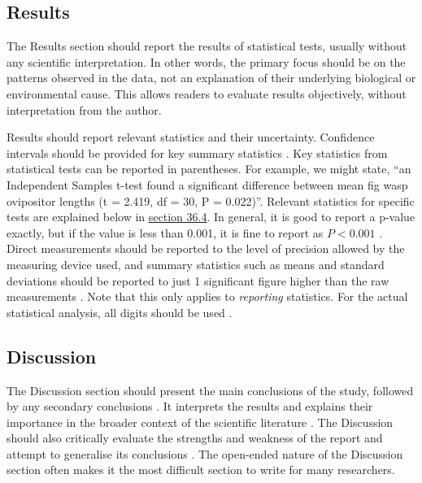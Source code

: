 \documentclass[
]{scrbook}
\begin{document}
\hypertarget{results}{%
\subsection{Results}\label{results}}

The Results section should report the results of statistical tests, usually without any scientific interpretation.
In other words, the primary focus should be on the patterns observed in the data, not an explanation of their underlying biological or environmental cause.
This allows readers to evaluate results objectively, without interpretation from the author.

Results should report relevant statistics and their uncertainty.
Confidence intervals should be provided for key summary statistics \citep{Lang1997}.
Key statistics from statistical tests can be reported in parentheses.
For example, we might state, ``an Independent Samples t-test found a significant difference between mean fig wasp ovipositor lengths (t = 2.419, df = 30, P = 0.022)''.
Relevant statistics for specific tests are explained below in \protect\hyperlink{statistical-tests}{section 36.4}.
In general, it is good to report a p-value exactly, but if the value is less than 0.001, it is fine to report as \(P < 0.001\) \citep{council2006scientific}.
Direct measurements should be reported to the level of precision allowed by the measuring device used, and summary statistics such as means and standard deviations should be reported to just 1 significant figure higher than the raw measurements \citep{council2006scientific}.
Note that this only applies to \emph{reporting} statistics.
For the actual statistical analysis, all digits should be used \citep{Lang1997}.

\hypertarget{discussion}{%
\subsection{Discussion}\label{discussion}}

The Discussion section should present the main conclusions of the study, followed by any secondary conclusions \citep{Woodford1999}.
It interprets the results and explains their importance in the broader context of the scientific literature \citep{Turbek2016}.
The Discussion should also critically evaluate the strengths and weakness of the report and attempt to generalise its conclusions \citep{Turbek2016}.
The open-ended nature of the Discussion section often makes it the most difficult section to write for many researchers.
\end{document}
